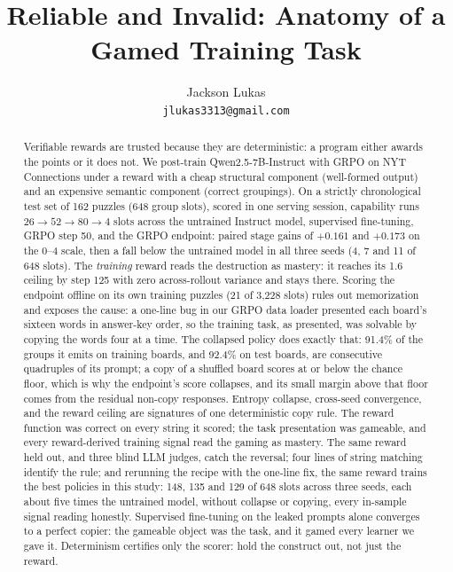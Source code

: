\documentclass{article}
\title{Reliable and Invalid: Anatomy of a Gamed Training Task}
\author{%
  Jackson Lukas \\
  \texttt{jlukas3313@gmail.com} \\
}
\begin{document}
\maketitle

\begin{abstract}
Verifiable rewards are trusted because they are deterministic: a program
either awards the points or it does not. We post-train Qwen2.5-7B-Instruct
with GRPO on NYT Connections under a reward with a cheap structural component
(well-formed output) and an expensive semantic component (correct
groupings). On a strictly chronological test set of 162 puzzles (648 group
slots), scored in one serving session, capability runs $26 \rightarrow 52
\rightarrow 80 \rightarrow 4$ slots across the untrained Instruct model,
supervised fine-tuning, GRPO step 50, and the GRPO endpoint: paired stage
gains of $+0.161$ and $+0.173$ on the
0--4 scale, then a fall below the untrained model in all three seeds (4, 7 and 11 of 648 slots). The \emph{training} reward reads the
destruction as mastery: it reaches its 1.6 ceiling by step 125 with zero
across-rollout variance and stays there. Scoring the endpoint offline on
its own training puzzles (21 of 3{,}228 slots) rules out memorization
and exposes the cause: a one-line bug in our GRPO data loader presented
each board's sixteen words in answer-key order, so the training task, as
presented, was solvable by copying the words four at a time. The collapsed policy does exactly that: 91.4\% of the groups it emits on training boards, and 92.4\% on test boards, are consecutive quadruples of its prompt; a copy of a shuffled board scores at or below the chance floor, which is why the endpoint's score collapses, and its small margin above that floor comes from the residual non-copy responses. Entropy collapse, cross-seed convergence, and the reward ceiling are signatures of one deterministic copy rule. The reward function was correct
on every string it scored; the task presentation was gameable, and every
reward-derived training signal read the gaming as mastery. The same reward held out, and three blind LLM judges, catch the reversal; four lines of string matching identify the rule; and rerunning the recipe with the one-line fix, the same reward trains the best policies in this study: 148, 135 and 129 of 648 slots across three seeds, each about five times the untrained model, without collapse or copying, every in-sample signal reading honestly. Supervised fine-tuning on the leaked prompts alone converges to a perfect copier: the gameable object was the task, and it gamed every learner we gave it. Determinism certifies only the scorer: hold the construct out, not just the reward.
\end{abstract}
\end{document}
